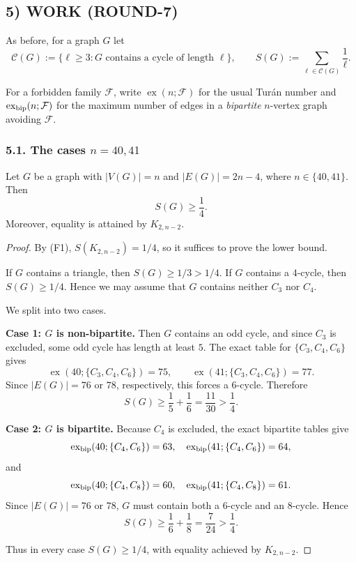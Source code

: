 \subsection*{5) WORK (ROUND-7)}

As before, for a graph $G$ let
\[
\mathcal C(G):=\{\ell\ge 3 : \text{$G$ contains a cycle of length $\ell$}\},
\qquad
S(G):=\sum_{\ell\in\mathcal C(G)}\frac1\ell.
\]

For a forbidden family $\mathcal F$, write $\operatorname{ex}(n;\mathcal F)$ for the usual Tur\'an number and
$\operatorname{ex}_{\rm bip}(n;\mathcal F)$ for the maximum number of edges in a \emph{bipartite} $n$-vertex graph avoiding $\mathcal F$.

\subsubsection*{5.1. The cases $n=40,41$}

\begin{proposition}[The line $m=2n-4$ at $n=40,41$]\label{prop:40-41}
Let $G$ be a graph with $|V(G)|=n$ and $|E(G)|=2n-4$, where $n\in\{40,41\}$.
Then
\[
S(G)\ge \frac14.
\]
Moreover, equality is attained by $K_{2,n-2}$.
\end{proposition}

\begin{proof}
By (F1), $S(K_{2,n-2})=1/4$, so it suffices to prove the lower bound.

If $G$ contains a triangle, then $S(G)\ge 1/3>1/4$.
If $G$ contains a $4$-cycle, then $S(G)\ge 1/4$.
Hence we may assume that $G$ contains neither $C_3$ nor $C_4$.

We split into two cases.

\medskip
\noindent\textbf{Case 1: $G$ is non-bipartite.}
Then $G$ contains an odd cycle, and since $C_3$ is excluded, some odd cycle has length at least $5$.
The exact table for $\{C_3,C_4,C_6\}$ gives
\[
\operatorname{ex}(40;\{C_3,C_4,C_6\})=75,\qquad
\operatorname{ex}(41;\{C_3,C_4,C_6\})=77.
\]
Since $|E(G)|=76$ or $78$, respectively, this forces a $6$-cycle.
Therefore
\[
S(G)\ge \frac15+\frac16=\frac{11}{30}>\frac14.
\]

\medskip
\noindent\textbf{Case 2: $G$ is bipartite.}
Because $C_4$ is excluded, the exact bipartite tables give
\[
\operatorname{ex}_{\rm bip}(40;\{C_4,C_6\})=63,\quad
\operatorname{ex}_{\rm bip}(41;\{C_4,C_6\})=64,
\]
and
\[
\operatorname{ex}_{\rm bip}(40;\{C_4,C_8\})=60,\quad
\operatorname{ex}_{\rm bip}(41;\{C_4,C_8\})=61.
\]
Since $|E(G)|=76$ or $78$, $G$ must contain both a $6$-cycle and an $8$-cycle.
Hence
\[
S(G)\ge \frac16+\frac18=\frac7{24}>\frac14.
\]

Thus in every case $S(G)\ge 1/4$, with equality achieved by $K_{2,n-2}$.
\end{proof}

